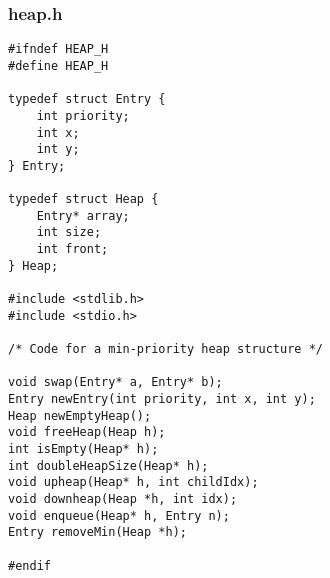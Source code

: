 \documentclass{article}
\begin{document}
\subsubsection*{heap.h}
\begin{lstlisting}
#ifndef HEAP_H
#define HEAP_H

typedef struct Entry {
	int priority;
	int x;
	int y;
} Entry;

typedef struct Heap {
	Entry* array;
	int size;
	int front;
} Heap;

#include <stdlib.h>
#include <stdio.h>

/* Code for a min-priority heap structure */

void swap(Entry* a, Entry* b);
Entry newEntry(int priority, int x, int y);
Heap newEmptyHeap();
void freeHeap(Heap h);
int isEmpty(Heap* h);
int doubleHeapSize(Heap* h);
void upheap(Heap* h, int childIdx);
void downheap(Heap *h, int idx);
void enqueue(Heap* h, Entry n);
Entry removeMin(Heap *h);

#endif
\end{lstlisting}
\end{document}
